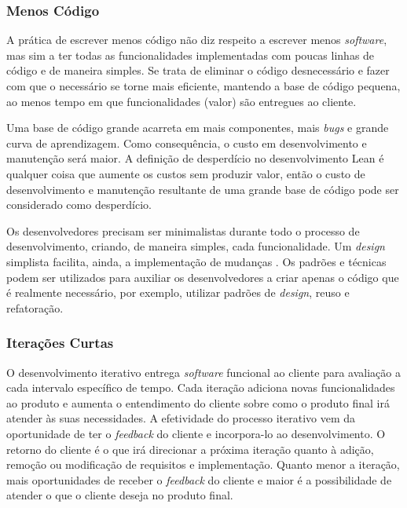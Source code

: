 \subsubsection[Menos Código ]{Menos Código}

A prática de escrever menos código não diz respeito a escrever menos \textit{software}, mas sim a ter todas as funcionalidades implementadas com poucas linhas de código e de maneira simples. Se trata de eliminar o código desnecessário e fazer com que o necessário se torne mais eficiente, mantendo a base de código pequena, ao menos tempo em que funcionalidades (valor) são entregues ao cliente.

Uma base de código grande acarreta em mais componentes, mais \textit{bugs} e grande curva de aprendizagem. Como consequência, o custo em desenvolvimento e manutenção será maior. A definição de desperdício no desenvolvimento Lean é qualquer coisa que aumente os custos sem produzir valor, então o custo de desenvolvimento e manutenção resultante de uma grande base de código pode ser considerado como desperdício. 

 Os desenvolvedores precisam ser minimalistas durante todo o processo de desenvolvimento, criando, de maneira simples, cada funcionalidade. Um \textit{design} simplista facilita, ainda, a implementação de mudanças \cite{hibbs2009}. Os padrões e técnicas podem ser utilizados para auxiliar os desenvolvedores a criar apenas o código que é realmente necessário, por exemplo, utilizar padrões de \textit{design}, reuso e refatoração.

\subsubsection[Iterações Curtas]{Iterações Curtas}

O desenvolvimento iterativo entrega \textit{software} funcional ao cliente para avaliação a cada intervalo específico de tempo. Cada iteração adiciona novas funcionalidades ao produto e aumenta o entendimento do cliente sobre como o produto final irá atender às suas necessidades. A efetividade do processo iterativo vem da oportunidade de ter o \textit{feedback} do cliente e incorpora-lo ao desenvolvimento. O retorno do cliente é o que irá direcionar a próxima iteração quanto à adição, remoção ou modificação de requisitos e implementação. Quanto menor a iteração, mais oportunidades de receber o \textit{feedback} do cliente e maior é a possibilidade de atender o que o cliente deseja no produto final. 

